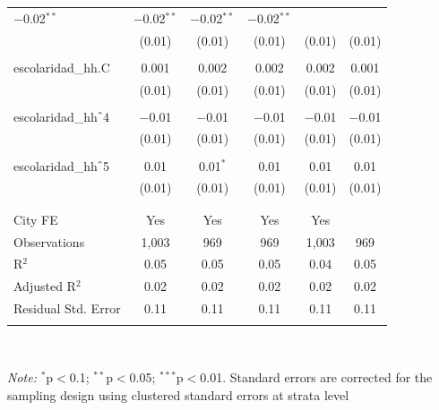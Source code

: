 \begin{table}[H]
\begin{tabularx}{0.9\textwidth}{@{\extracolsep{-7pt}}lccccc}
$-$0.02$^{**}$ & $-$0.02$^{**}$ & $-$0.02$^{**}$ & $-$0.02$^{**}$ \\    & (0.01) & (0.01) & (0.01) & (0.01) & (0.01) \\    & & & & & \\   escolaridad\_hh.C & 0.001 & 0.002 & 0.002 & 0.002 & 0.001 \\    & (0.01) & (0.01) & (0.01) & (0.01) & (0.01) \\    & & & & & \\   escolaridad\_hh$\hat{\mkern6mu}$4 & $-$0.01 & $-$0.01 & $-$0.01 & $-$0.01 & $-$0.01 \\    & (0.01) & (0.01) & (0.01) & (0.01) & (0.01) \\    & & & & & \\   escolaridad\_hh$\hat{\mkern6mu}$5 & 0.01 & 0.01$^{*}$ & 0.01 & 0.01 & 0.01 \\    & (0.01) & (0.01) & (0.01) & (0.01) & (0.01) \\    & & & & & \\  \hline \\[-1.8ex]  City FE & Yes & Yes & Yes & Yes &  \\  Observations & 1,003 & 969 & 969 & 1,003 & 969 \\  R$^{2}$ & 0.05 & 0.05 & 0.05 & 0.04 & 0.05 \\  Adjusted R$^{2}$ & 0.02 & 0.02 & 0.02 & 0.02 & 0.02 \\  Residual Std. Error & 0.11 & 0.11 & 0.11 & 0.11 & 0.11 \\  \hline  \hline \\[-1.8ex]  \end{tabularx} \\ \parbox[]{\textwidth}{\textit{Note:} $^{*}$p$<$0.1; $^{**}$p$<$0.05; $^{***}$p$<$0.01. Standard errors are corrected for the sampling design using clustered standard errors at strata level }  \end{table} 